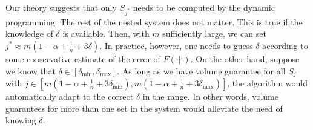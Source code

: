 Our theory suggests that only $S_{j^*}$ needs to be computed by the dynamic programming. The rest of the nested system does not matter. This is true if the knowledge of $\delta$ is available. Then, with $m$ sufficiently large, we can set $j^*\approx m\left(1-\alpha+\frac{1}{n}+3\delta\right)$. In practice, however, one needs to guess $\delta$ according to some conservative estimate of the error of $\hat{F}(\cdot|\cdot)$. On the other hand, suppose we know that $\delta\in [\delta_{\min},\delta_{\max}]$. As long as we have volume guarantee for all $S_j$ with $j\in\left[m\left(1-\alpha+\frac{1}{n}+3\delta_{\min}\right),m\left(1-\alpha+\frac{1}{n}+3\delta_{\max}\right)\right]$, the algorithm would automatically adapt to the correct $\delta$ in the range. In other words, volume guarantees for more than one set in the system would alleviate the need of knowing $\delta$.
\fi